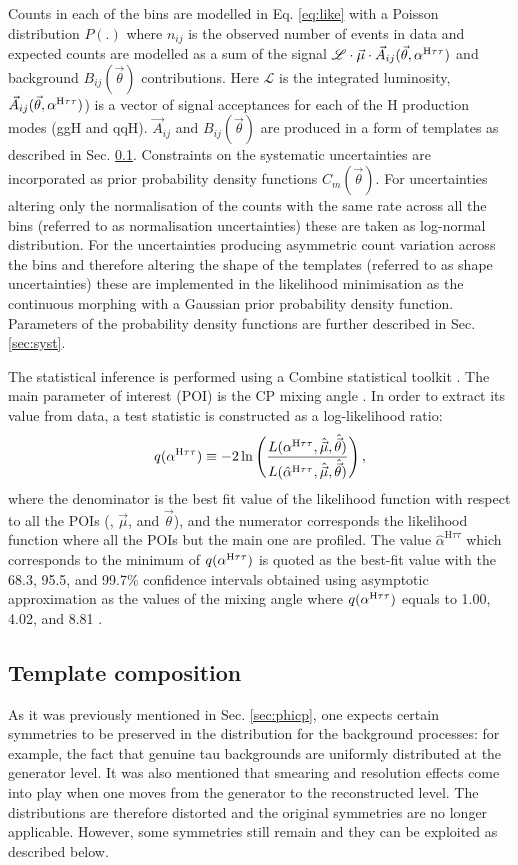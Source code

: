 Counts in each of the bins are modelled in Eq. \ref{eq:like} with a Poisson distribution $P(.)$ where $n_{ij}$ is the observed number of events in data and expected counts are modelled as a sum of the signal $\mathcal{L} \cdot \vec{\mu} \cdot \vec{A}_{ij}(\vec{\theta}, \alpha^{\text{H}\tau\tau})$ and background $B_{ij}(\vec{\theta})$ contributions. Here $\mathcal{L}$ is the integrated luminosity, $\vec{A}_{ij}(\vec{\theta}, \alpha^{\text{H}\tau\tau})$) is a vector of signal acceptances for each of the H production modes (ggH and qqH). $\vec{A}_{ij}$ and $B_{ij}(\vec{\theta})$ are produced in a form of templates as described in Sec. \ref{sec:temp}. Constraints on the systematic uncertainties are incorporated as prior probability density functions $C_m(\vec{\theta})$. For uncertainties altering only the normalisation of the counts with the same rate across all the bins (referred to as normalisation uncertainties) these are taken as log-normal distribution. For the uncertainties producing asymmetric count variation across the bins and therefore altering the shape of the templates (referred to as shape uncertainties) these are implemented in the likelihood minimisation as the continuous morphing with a Gaussian prior probability density
function. Parameters of the probability density functions are further described in Sec. \ref{sec:syst}.

The statistical inference is performed using a Combine statistical toolkit \cite{combine}. The main parameter of interest (POI) is the CP mixing angle \mixa. In order to extract its value from data, a test statistic is constructed as a log-likelihood ratio:
\begin{equation}
    q(\alpha^{\text{H}\tau\tau}) \equiv -2\ln\left(\dfrac{L(\alpha^{\text{H}\tau\tau}, \hat{\vec{\mu}}, \hat{\vec{\theta}})}{L(\hat{\alpha}^{\text{H}\tau\tau}, \hat{\vec{\mu}}, \hat{\vec{\theta}})}\right),
\end{equation}
where the denominator is the best fit value of the likelihood function with respect to all the POIs (\mixa, $\vec{\mu}$, and $\vec{\theta}$), and the numerator corresponds the likelihood function where all the POIs but the main one are profiled. The value $\hat{\alpha}^{\text{H}\tau\tau}$ which corresponds to the minimum of $q(\alpha^{\text{H}\tau\tau})$ is quoted as the best-fit value with the 68.3, 95.5, and 99.7\% confidence intervals obtained using asymptotic approximation as the values of the mixing angle \mixa where $q(\alpha^{\text{H}\tau\tau})$ equals to 1.00, 4.02, and 8.81 \cite{Cowan:2010js}.

\subsection{Template composition}\label{sec:temp}
As it was previously mentioned in Sec. \ref{sec:phicp}, one expects certain symmetries to be preserved in the \phicp distribution for the background processes: for example, the fact that genuine tau backgrounds are uniformly distributed at the generator level. It was also mentioned that smearing and resolution effects come into play when one moves from the generator to the reconstructed level. The distributions are therefore distorted and the original symmetries are no longer applicable. However, some symmetries still remain and they can be exploited as described below.

